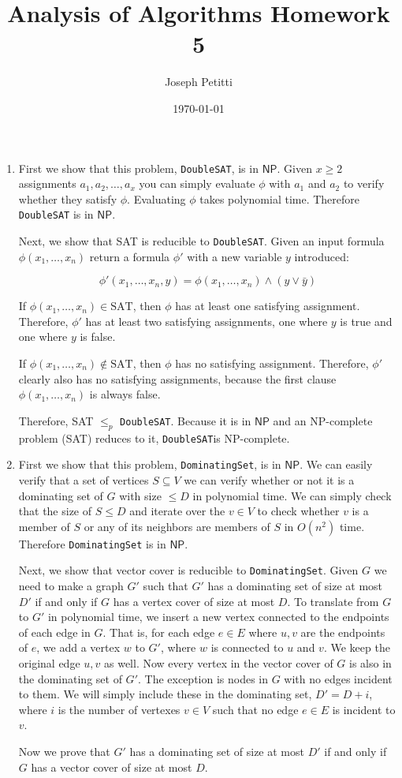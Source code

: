 \documentclass[a4paper, 10pt]{article}
\title{Analysis of Algorithms Homework 5}
\author{Joseph Petitti}
\date{\today}
\begin{document}
\maketitle

\begin{enumerate}
	\item First we show that this problem, \texttt{DoubleSAT}, is in
		$\mathsf{NP}$. Given $x \ge 2$ assignments $a_1, a_2, \dots , a_x$ you
		can simply evaluate $\phi$ with $a_1$ and $a_2$ to verify whether they
		satisfy $\phi$. Evaluating $\phi$ takes polynomial time. Therefore
		\texttt{DoubleSAT} is in $\mathsf{NP}$.

		Next, we show that SAT is reducible to \texttt{DoubleSAT}. Given an
		input formula $\phi(x_1, \dots, x_n)$ return a formula $\phi'$ with a
		new variable $y$ introduced:
		
		$$\phi'(x_1, \dots, x_n, y) = \phi(x_1, \dots, x_n) \land (y \lor \bar
		y)$$ 

		If $\phi(x_1, \dots, x_n) \in \mathrm{SAT}$, then $\phi$ has at least
		one satisfying assignment. Therefore, $\phi'$ has at least two
		satisfying assignments, one where $y$ is true and one where $y$ is
		false.

		If $\phi(x_1, \dots, x_n) \notin \mathrm{SAT}$, then $\phi$ has no
		satisfying assignment. Therefore, $\phi'$ clearly also has no
		satisfying assignments, because the first clause $\phi(x_1, \dots, x_n)$
		is always false.

		Therefore, SAT $\le_p$ \texttt{DoubleSAT}. Because it is in
		$\mathsf{NP}$ and an NP-complete problem (SAT) reduces to it,
		\texttt{DoubleSAT}is NP-complete.

	\item First we show that this problem, \texttt{DominatingSet}, is in
		$\mathsf{NP}$. We can easily verify that a set of vertices $S \subseteq
		V$ we can verify whether or not it is a dominating set of $G$ with size
		$\le D$ in polynomial time. We can simply check that the size of $S \le
		D$ and iterate over the $v \in V$ to check whether $v$ is a member of
		$S$ or any of its neighbors are members of $S$ in $O(n^2)$ time.
		Therefore \texttt{DominatingSet} is in $\mathsf{NP}$.

		Next, we show that vector cover is reducible to \texttt{DominatingSet}.
		Given $G$ we need to make a graph $G'$ such that $G'$ has a dominating
		set of size at most $D'$ if and only if $G$ has a vertex cover of size at
		most $D$. To translate from $G$ to $G'$ in polynomial time, we insert a
		new vertex connected to the endpoints of each edge in $G$. That is,
		for each edge $e \in E$ where $u, v$ are the endpoints of $e$, we add a
		vertex $w$ to $G'$, where $w$ is connected to $u$ and $v$. We keep the
		original edge $u, v$ as well. Now every vertex in the vector cover of
		$G$ is also in the dominating set of $G'$. The exception is nodes in $G$
		with no edges incident to them. We will simply include these in the
		dominating set, $D' = D + i$, where $i$ is the number of vertexes $v \in
		V$ such that no edge $e \in E$ is incident to $v$.

		Now we prove that $G'$ has a dominating set of size at most $D'$ if and
		only if $G$ has a vector cover of size at most $D$.
\end{enumerate}
\end{document}
